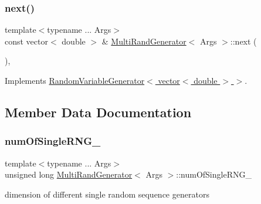 \subsubsection{\texorpdfstring{next()}{next()}}
{\footnotesize\ttfamily template$<$typename ... Args$>$ \\
const vector$<$ double $>$ \& \hyperlink{class_multi_rand_generator}{Multi\+Rand\+Generator}$<$ Args $>$\+::next (\begin{DoxyParamCaption}{ }\end{DoxyParamCaption})\hspace{0.3cm}{\ttfamily [override]}, {\ttfamily [virtual]}}



Implements \hyperlink{class_random_variable_generator_a5178e1f85eff432dffd6320767136836}{Random\+Variable\+Generator$<$ vector$<$ double $>$ $>$}.



\subsection{Member Data Documentation}
\hypertarget{class_multi_rand_generator_a31ad84bf3f1e2c7db54b563945801b75}{}\label{class_multi_rand_generator_a31ad84bf3f1e2c7db54b563945801b75} 
\subsubsection{\texorpdfstring{num\+Of\+Single\+R\+N\+G\+\_\+}{numOfSingleRNG\_}}
{\footnotesize\ttfamily template$<$typename ... Args$>$ \\
unsigned long \hyperlink{class_multi_rand_generator}{Multi\+Rand\+Generator}$<$ Args $>$\+::num\+Of\+Single\+R\+N\+G\+\_\+\hspace{0.3cm}{\ttfamily [private]}}



dimension of different single random sequence generators 

\hypertarget{class_multi_rand_generator_a267533dce301acea01978671fa3cb72f}{}\label{class_multi_rand_generator_a267533dce301acea01978671fa3cb72f} 
